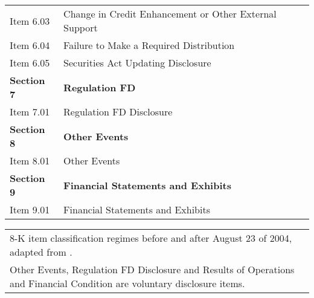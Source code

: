 \begin{table}[H]
\begin{tabular}{ll}
    Item 6.03 & Change in Credit Enhancement or Other External Support \\
    Item 6.04 & Failure to Make a Required Distribution \\
    Item 6.05 & Securities Act Updating Disclosure \\
    \textbf{Section 7} & \textbf{Regulation FD} \\
    Item 7.01 & Regulation FD Disclosure \\
    \textbf{Section 8} & \textbf{Other Events} \\
    Item 8.01 & Other Events \\
    \textbf{Section 9} & \textbf{Financial Statements and Exhibits} \\
    Item 9.01 & Financial Statements and Exhibits \\
    \end{tabular}%

\begin{tabular}{l}
8-K item classification regimes before and after August 23 of 2004, adapted from \cite{secFinalRuleAdditional2004}. \\
Other Events, Regulation FD Disclosure and Results of Operations and Financial Condition are voluntary disclosure items.
\end{tabular}
\end{table}%
